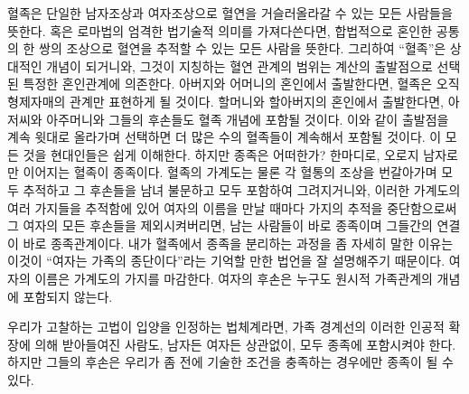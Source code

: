 혈족은 단일한 남자조상과 여자조상으로 혈연을 거슬러올라갈 수 있는
모든 사람들을 뜻한다.
혹은 로마법의 엄격한 법기술적 의미를 가져다쓴다면,
합법적으로 혼인한 공통의 한 쌍의 조상으로
혈연을 추적할 수 있는 모든 사람을 뜻한다.
그리하여 ``혈족''은 상대적인 개념이 되거니와,
그것이 지칭하는 혈연 관계의 범위는 계산의 출발점으로 선택된
특정한 혼인관계에 의존한다.
아버지와 어머니의 혼인에서 출발한다면, 혈족은 오직
형제자매의 관계만 표현하게 될 것이다.
할머니와 할아버지의 혼인에서 출발한다면, 아저씨와 아주머니와 그들의 후손들도
혈족 개념에 포함될 것이다.
이와 같이 출발점을 계속 윗대로 올라가며 선택하면 더 많은 수의 혈족들이
계속해서 포함될 것이다.
이 모든 것을 현대인들은 쉽게 이해한다.
하지만 종족은 어떠한가?
한마디로, 오로지 남자로만 이어지는 혈족이 종족이다.
혈족의 가계도는 물론 각 혈통의 조상을 번갈아가며 모두 추적하고
그 후손들을 남녀 불문하고 모두 포함하여 그려지거니와,
이러한 가계도의 여러 가지들을 추적함에 있어
여자의 이름을 만날 때마다 가지의 추적을 중단함으로써
그 여자의 모든 후손들을 제외시켜버리면,
남는 사람들이 바로 종족이며 그들간의 연결이 바로 종족관계이다.
내가 혈족에서 종족을 분리하는 과정을 좀 자세히 말한 이유는 이것이
``여자는 가족의 종단이다''라는
기억할 만한 법언을 잘 설명해주기 때문이다.
여자의 이름은 가계도의 가지를 마감한다.
여자의 후손은 누구도 원시적 가족관계의 개념에 포함되지 않는다.

우리가 고찰하는 고법이 입양을 인정하는 법체계라면,
가족 경계선의 이러한 인공적 확장에 의해 받아들여진 사람도,
남자든 여자든 상관없이, 모두 종족에 포함시켜야 한다.
하지만 그들의 후손은 우리가 좀 전에 기술한 조건을 충족하는 경우에만
종족이 될 수 있다.

